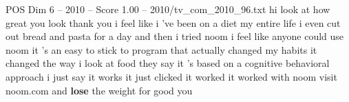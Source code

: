 \begin{textsample}{POS Dim 6 – 2010 – Score 1.00 – 2010/tv\_com\_2010\_96.txt}  \label{ex:f6_pos_061}
hi look at how great you look thank you i feel like i 've been on a diet my entire life i even cut out bread and pasta for a day and then i tried noom i feel like anyone could use noom it 's an easy to stick to program that actually changed my habits it changed the way i look at food they say it 's based on a cognitive behavioral approach i just say it works it just clicked it worked it worked with noom visit noom.com and \textbf{lose} the weight for good you

\end{textsample}
